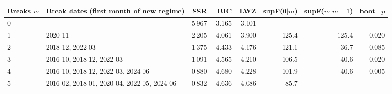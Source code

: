 \begin{tabular}{lp{5.2cm}rrrrrr}
\toprule
Breaks $m$ & Break dates (first month of new regime) & SSR & BIC & LWZ & supF(0$|m$) & supF($m|m-1$) & boot.\ $p$ \\
\midrule
0 & -- & 5.967 & -3.165 & -3.101 & -- & -- & -- \\
1 & 2020-11 & 2.205 & -4.061 & -3.900 & 125.4 & 125.4 & 0.020 \\
2 & 2018-12, 2022-03 & 1.375 & -4.433 & -4.176 & 121.1 & 36.7 & 0.085 \\
3 & 2016-10, 2018-12, 2022-03 & 1.091 & -4.565 & -4.210 & 106.5 & 40.6 & 0.020 \\
4 & 2016-10, 2018-12, 2022-03, 2024-06 & 0.880 & -4.680 & -4.228 & 101.9 & 40.6 & 0.005 \\
5 & 2016-02, 2018-01, 2020-04, 2022-05, 2024-06 & 0.832 & -4.636 & -4.086 & 85.7 & -- & -- \\
\bottomrule
\end{tabular}